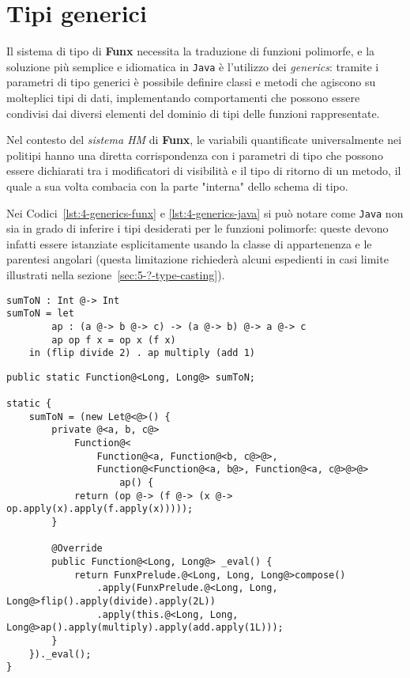 \section{Tipi generici}
\label{sec:4-3-generics}

Il sistema di tipo di \textbf{Funx} necessita la traduzione di funzioni polimorfe,
e la soluzione più semplice e idiomatica in \texttt{Java} è l'utilizzo dei \textit{generics}:
tramite i parametri di tipo generici è possibile definire classi e metodi che agiscono su molteplici tipi di dati,
implementando comportamenti che possono essere condivisi dai diversi elementi del dominio di tipi delle funzioni rappresentate.

Nel contesto del \textit{sistema HM} di \textbf{Funx}, le variabili quantificate universalmente nei politipi
hanno una diretta corrispondenza con i parametri di tipo che possono essere dichiarati tra i modificatori di visibilità
e il tipo di ritorno di un metodo, il quale a sua volta combacia con la parte "interna" dello schema di tipo.

Nei Codici~\ref{lst:4-generics-funx} e \ref{lst:4-generics-java} si può notare come \texttt{Java} non sia in grado
di inferire i tipi desiderati per le funzioni polimorfe: queste devono infatti essere istanziate esplicitamente
usando la classe di appartenenza e le parentesi angolari (questa limitazione richiederà alcuni espedienti in casi limite
illustrati nella sezione~\ref{sec:5-?-type-casting}).

\vspace{4mm}
\begin{lstlisting}[caption={Scrittura e utilizzo di funzioni polimorfe in \textbf{Funx}}, style=funxCode, label={lst:4-generics-funx}]
sumToN : Int @-> Int
sumToN = let
        ap : (a @-> b @-> c) -> (a @-> b) @-> a @-> c
        ap op f x = op x (f x)
    in (flip divide 2) . ap multiply (add 1)
\end{lstlisting}
\vspace{4mm}
\begin{lstlisting}[caption={Corrispondente traduzione in \texttt{Java}}, style=javaCode, label={lst:4-generics-java}]
public static Function@<Long, Long@> sumToN;

static {
    sumToN = (new Let@<@>() {
        private @<a, b, c@>
            Function@<
                Function@<a, Function@<b, c@>@>,
                Function@<Function@<a, b@>, Function@<a, c@>@>@>
                    ap() {
            return (op @-> (f @-> (x @-> op.apply(x).apply(f.apply(x)))));
        }

        @Override
        public Function@<Long, Long@> _eval() {
            return FunxPrelude.@<Long, Long, Long@>compose()
                .apply(FunxPrelude.@<Long, Long, Long@>flip().apply(divide).apply(2L))
                .apply(this.@<Long, Long, Long@>ap().apply(multiply).apply(add.apply(1L)));
        }
    })._eval();
}  
\end{lstlisting}
